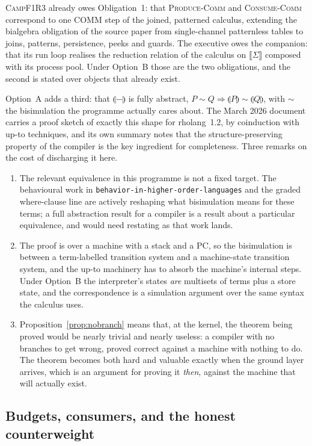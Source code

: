 \documentclass[11pt,a4paper]{article}
\newcommand{\code}[1]{\texttt{#1}}
\newcommand{\Camp}{\textsc{CampF1R3}}
\newcommand{\cmp}[1]{\llparenthesis #1 \rrparenthesis}
\theoremstyle{definition}
\theoremstyle{plain}
\begin{document}
\Camp{} already owes Obligation~1: that \textsc{Produce-Comm} and
\textsc{Consume-Comm} correspond to one COMM step of the joined, patterned
calculus, extending the bialgebra obligation of the source paper from
single-channel patternless tables to joins, patterns, persistence, peeks and
guards. The executive owes the companion: that its run loop realises the
reduction relation of the calculus on $\llbracket\Sigma\rrbracket$ composed with
its process pool. Under Option~B those are the two obligations, and the second
is stated over objects that already exist.

Option~A adds a third: that $\cmp{-}$ is fully abstract, $P\sim Q \Rightarrow
\cmp{P}\sim\cmp{Q}$, with $\sim$ the bisimulation the programme actually cares
about. The March 2026 document carries a proof sketch of exactly this shape for
rholang~1.2, by coinduction with up-to techniques, and its own summary notes
that the structure-preserving property of the compiler is the key ingredient for
completeness. Three remarks on the cost of discharging it here.

\begin{enumerate}[leftmargin=1.8em,nosep]
\item The relevant equivalence in this programme is not a fixed target. The
behavioural work in \code{behavior-in-higher-order-languages} and the graded
where-clause line are actively reshaping what bisimulation means for these
terms; a full abstraction result for a compiler is a result about a particular
equivalence, and would need restating as that work lands.
\item The proof is over a machine with a stack and a PC, so the bisimulation is
between a term-labelled transition system and a machine-state transition system,
and the up-to machinery has to absorb the machine's internal steps. Under
Option~B the interpreter's states \emph{are} multisets of terms plus a store
state, and the correspondence is a simulation argument over the same syntax the
calculus uses.
\item Proposition~\ref{prop:nobranch} means that, at the kernel, the theorem
being proved would be nearly trivial and nearly useless: a compiler with no
branches to get wrong, proved correct against a machine with nothing to do. The
theorem becomes both hard and valuable exactly when the ground layer arrives,
which is an argument for proving it \emph{then}, against the machine that will
actually exist.
\end{enumerate}

\subsection{Budgets, consumers, and the honest counterweight}
\end{document}
